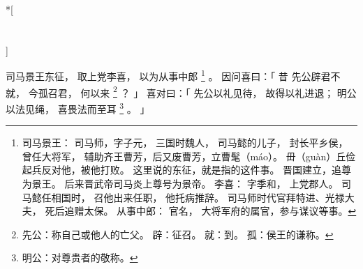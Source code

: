 
\switchcolumn[0]*[\section{}]

司马景王东征，
取上党李喜，
以为从事中郎%
\footnote{%
    司马景王：
        司马师，字子元，
        三国时魏人，
        司马懿的儿子，
        封长平乡侯，曾任大将军，
        辅助齐王曹芳，后又废曹芳，立曹髦（máo）。
        毌（guàn）丘俭起兵反对他，被他打败。
        这里说的东征，就是指的这件事。
        晋国建立，追尊为景王。
        后来晋武帝司马炎上尊号为景帝。
    李喜：
        字季和，
        上党郡人。
        司马懿任相国时，
        召他出来任职，
        他托病推辞。
        司马师时代官拜特进、光禄大夫，
        死后追赠太保。
    从事中郎：
        官名，
        大将军府的属官，参与谋议等事。
}%
。
因问喜曰：「
    昔
    先公辟君不就，
    今孤召君，
    何以来%
    \footnote{%
        先公：称自己或他人的亡父。
        辟：征召。
        就：到。
        孤：侯王的谦称。
    }%
    ？
」
喜对曰：「
    先公以礼见待，
    故得以礼进退；
    明公以法见绳，
    喜畏法而至耳%
    \footnote{%
        明公：对尊贵者的敬称。
    }%
    。
」

\switchcolumn



